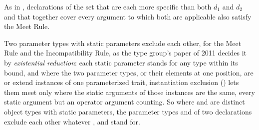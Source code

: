 As in , declarations of the set that are each more
specific than both $d_1$ and $d_2$ and that together cover every argument to
which both are applicable also satisfy the Meet Rule.

Two parameter types with static parameters exclude each other, for the Meet
Rule and the Incompatibility Rule, as the type group's paper of 2011 decides it
by \emph{existential reduction}: each static parameter stands for any type
within its bound, and where the two parameter types, or their elements at one
position, are or extend instances of one parameterized trait, instantiation
exclusion () lets them meet only where the static arguments
of those instances are the same, every static argument but an operator argument
counting.
So where  and  are distinct object types with static
parameters, the parameter types  and
 of two declarations exclude each
other whatever ,  and  stand for.

